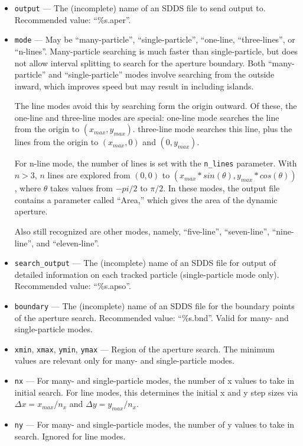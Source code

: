 \documentclass[11pt]{article}
\begin{document}
\begin{itemize}
\item \verb|output| --- The (incomplete) name of an SDDS file to send output to.  
 Recommended value: ``\%s.aper''.

\item \verb|mode| --- May be ``many-particle'', ``single-particle'', ``one-line, ``three-lines'', or ``n-lines''.
Many-particle searching is much
faster than single-particle, but does not allow interval splitting to
search for the aperture boundary.  Both ``many-particle'' and
``single-particle'' modes involve searching from the outside inward,
which improves speed but may result in including islands.

The line modes avoid this by searching form the origin
outward.  Of these, the one-line and three-line modes are special:
one-line mode searches the line from the origin to $(x_{max},
y_{max})$.  three-line mode searches this line, plus the lines from
the origin to $(x_{max}, 0)$ and $(0, y_{max})$.  

For n-line mode, the number of lines is set with the \verb|n_lines| parameter.
With $n>3$, $n$ lines are explored from $(0,0)$ to
$(x_{max}*sin(\theta), y_{max}*cos(\theta))$, where $\theta$ takes
values from $-pi/2$ to $\pi/2$.   In these modes, the output file contains
a parameter called ``Area,'' which gives the area of the dynamic aperture.

Also still recognized are other modes, namely, ``five-line'', ``seven-line'', ``nine-line'',
and ``eleven-line''.

\item \verb|search_output| --- The (incomplete) name of an SDDS file for output of detailed
 information on each tracked particle (single-particle mode only).  Recommended value:
 ``\%s.apso''.

\item \verb|boundary| --- The (incomplete) name of an SDDS 
file for the boundary points of the aperture search.  Recommended value: ``\%s.bnd''.
Valid for many- and single-particle modes.

\item \verb|xmin|, \verb|xmax|, \verb|ymin|, \verb|ymax| --- Region of the aperture search.
The minimum values are relevant only for many- and single-particle modes.

\item \verb|nx| --- For many- and single-particle modes, the number of x values to take in initial search.
  For line modes, this determines the initial x and y step sizes via $\Delta x = x_{max}/n_x$ and
  $\Delta y = y_{max}/n_x$.
\item \verb|ny| --- For many- and single-particle modes, the number of y values to take in search.
  Ignored for line modes.


\end{itemize}
\end{document}
